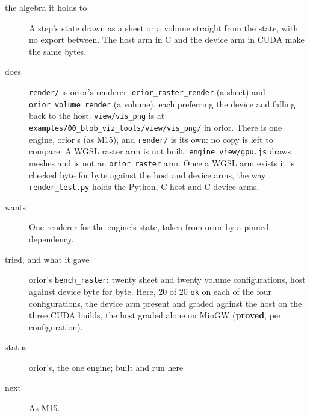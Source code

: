 \begin{description}
\item[{the algebra it holds to}] A step's state drawn as a sheet or a volume straight from the state, with no export between. The host arm in C and the device arm in CUDA make the same bytes.
\item[{does}] \texttt{render/\allowbreak{}} is orior's renderer: \texttt{orior\_\allowbreak{}raster\_\allowbreak{}render} (a sheet) and \texttt{orior\_\allowbreak{}volume\_\allowbreak{}render} (a volume), each preferring the device and falling back to the host. \texttt{view/\allowbreak{}vis\_\allowbreak{}png} is at \texttt{examples/\allowbreak{}00\_\allowbreak{}blob\_\allowbreak{}viz\_\allowbreak{}tools/\allowbreak{}view/\allowbreak{}vis\_\allowbreak{}png/\allowbreak{}} in orior. There is one engine, orior's (as M15), and \texttt{render/\allowbreak{}} is its own: no copy is left to compare. A WGSL raster arm is not built: \texttt{engine\_\allowbreak{}view/\allowbreak{}gpu.\allowbreak{}js} draws meshes and is not an \texttt{orior\_\allowbreak{}raster} arm. Once a WGSL arm exists it is checked byte for byte against the host and device arms, the way \texttt{render\_\allowbreak{}test.\allowbreak{}py} holds the Python, C host and C device arms.
\item[{wants}] One renderer for the engine's state, taken from orior by a pinned dependency.
\item[{tried, and what it gave}] orior's \texttt{bench\_\allowbreak{}raster}: twenty sheet and twenty volume configurations, host against device byte for byte. Here, 20 of 20 \texttt{ok} on each of the four configurations, the device arm present and graded against the host on the three CUDA builds, the host graded alone on MinGW (\textbf{proved}, per configuration).
\item[{status}] orior's, the one engine; built and run here
\item[{next}] As M15.
\end{description}


